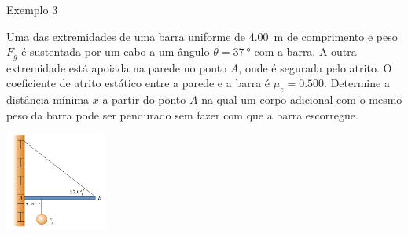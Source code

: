 \begin{frame}{Exemplo 3}
    \begin{minipage}{\textwidth}
        Uma das extremidades de uma barra uniforme de \SI{4.00}{m} de comprimento e peso $F_g$ é sustentada por um cabo a um
        ângulo $\theta=\SI{37}{\degree}$ com a barra. A outra extremidade está apoiada na parede no ponto $A$, onde é segurada pelo atrito.
        O coeficiente de atrito estático entre a parede e a barra é $\mu_e=\num{0.500}$.
        Determine a distância mínima $x$ a partir do ponto $A$ na qual um corpo adicional com o mesmo peso da barra pode ser pendurado sem
        fazer com que a barra escorregue.
    \end{minipage}

    \begin{center}
        \includegraphics[width=0.25\textwidth]{images/pendurado}
    \end{center}
\end{frame}



